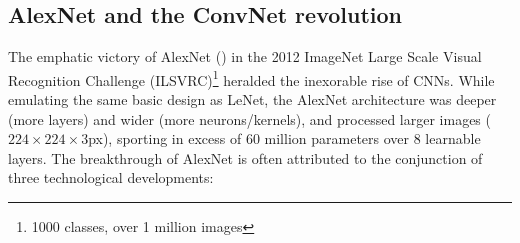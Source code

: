 


\subsection{AlexNet and the ConvNet revolution}

The emphatic victory of AlexNet (\cite{krizhevsky2012imagenet}) in the 2012 ImageNet Large Scale Visual Recognition Challenge (ILSVRC)\footnote{1000 classes, over 1 million images} heralded the inexorable rise of CNNs. While emulating the same basic design as LeNet, the AlexNet architecture was deeper (more layers) and wider (more neurons/kernels), and processed larger images ($224\times224\times3$px), sporting in excess of $60$ million parameters over $8$ learnable layers. The breakthrough of AlexNet is often attributed to the conjunction of three technological developments:

